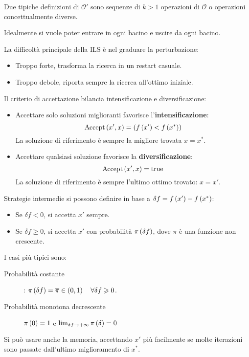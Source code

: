 \documentclass[\main/main.tex]{subfiles}
\begin{document}
\begin{multicols}{2}
\begin{definition}
    Due tipiche definizioni di \(\mathcal{O}'\) sono sequenze di \(k>1\) operazioni di \(\mathcal{O}\) o operazioni concettualmente diverse.
    
    Idealmente si vuole poter entrare in ogni bacino e uscire da ogni bacino.
\end{definition}
\begin{observation}
    La difficoltà principale della ILS è nel graduare la perturbazione:
    \begin{itemize}
        \item Troppo forte, trasforma la ricerca in un restart casuale.
        \item Troppo debole, riporta sempre la ricerca all'ottimo iniziale.
    \end{itemize}
\end{observation}
\begin{definition}
    Il criterio di accettazione bilancia intensificazione e diversificazione:
    \begin{itemize}
        \item Accettare solo soluzioni miglioranti favorisce l'\textbf{intensificazione}:
        \[
            \text{Accept}\left(x', x\right) = \left(f\left(x'\right) < f \left(x^*\right)\right)
        \]
        La soluzione di riferimento è sempre la migliore trovata \(x = x^*\).
        \item Accettare qualsiasi soluzione favorisce la \textbf{diversificazione}:
        \[
            \text{Accept}\left(x', x\right) = \text{true}
        \]
        La soluzione di riferimento è sempre l'ultimo ottimo trovato: \(x = x'\).
    \end{itemize}
\end{definition}
\begin{definition}
    Strategie intermedie si possono definire in base a \(\delta f = f\left(x'\right) - f\left(x^*\right)\):
    \begin{itemize}
        \item Se \(\delta f < 0\), si accetta \(x'\) sempre.
        \item Se \(\delta f \geq 0\), si accetta \(x'\) con probabilità \(\pi\left(\delta f\right)\), dove \(\pi\) è una funzione non crescente.
    \end{itemize}
    
    I casi più tipici sono:
    \begin{description}
        \item[Probabilità costante]: \(\pi\left(\delta f\right) = \overline{\pi} \in \left(0, 1\right) \quad \forall \delta f \geqslant 0\).
        \item[Probabilità monotona decrescente] \(\pi\left(0\right) = 1\) e \(\lim_{\delta f \rightarrow + \infty} \pi\left(\delta\right) = 0\)
    \end{description}
    
    Si può usare anche la memoria, accettando \(x'\) più facilmente se molte iterazioni sono passate dall'ultimo miglioramento di \(x^*\).
\end{definition}
\end{multicols}
\clearpage
\end{document}
